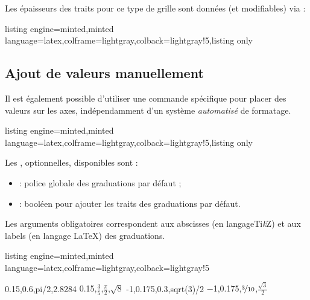 \documentclass[11pt,a4paper]{ltxdoc}
\providecommand\tikzlogo{Ti\textit{k}Z}
\let\TikZ\tikzlogo
\begin{document}
Les épaisseurs des traits pour ce type de grille sont données (et modifiables) via :

\begin{tcblisting}{listing engine=minted,minted language=latex,colframe=lightgray,colback=lightgray!5,listing only}
\setlength\pflthickgridp{0.65pt}    %
\setlength\pflthickgridi{0.5pt}     %
\setlength\pflthickgrids{0.35pt}    %
\end{tcblisting}

\pagebreak

\subsection{Ajout de valeurs manuellement}\label{ajoutvals}

Il est également possible d'utiliser une commande spécifique pour placer des valeurs sur les axes, indépendamment d'un système \textit{automatisé} de formatage.

\begin{tcblisting}{listing engine=minted,minted language=latex,colframe=lightgray,colback=lightgray!5,listing only}
\end{tcblisting}

Les \MontreCode{[clés]}, optionnelles, disponibles sont :

\smallskip

\begin{itemize}
  \item {} : police globale des graduations { par défaut} ;
  \item {} : booléen pour ajouter les traits des graduations { par défaut}.
\end{itemize}

\smallskip

Les arguments obligatoires correspondent aux abscisses (en langage\TikZ) et aux labels (en langage \LaTeX) des graduations.

\begin{tcblisting}{listing engine=minted,minted language=latex,colframe=lightgray,colback=lightgray!5}
\begin{GraphiqueTikz}%
  [x=2.75cm,y=3cm,
  Xmin=0,Xmax=3.5,Xgrille=pi/12,Xgrilles=pi/24,
  Ymin=-1.05,Ymax=1.05,Ygrille=0.2,Ygrilles=0.05]
  \TracerAxesGrilles[Grad=false,Elargir=2.5mm,]{}{}
  \RajouterValeursAxeX
    {0.15,0.6,pi/2,2.8284}
    {\num{0.15},$\frac35$,$\displaystyle\frac{\pi}{2}$,$\sqrt{8}$}
  \RajouterValeursAxeY
    {-1,0.175,0.3,sqrt(3)/2}
    {\num{-1},\num{0.175},$\nicefrac{3}{10}$,$\frac{\sqrt{3}}{2}$}
\end{GraphiqueTikz}
\end{tcblisting}
\end{document}
